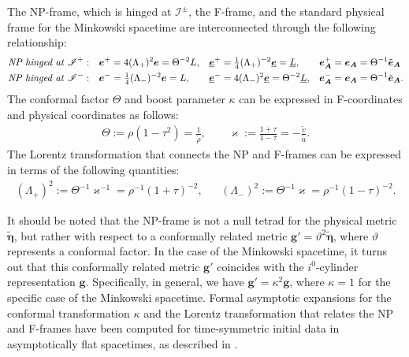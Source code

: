 \begin{proposition}\label{Prop:NPtoFgauge}
  The NP-frame, which is hinged at $\mathscr{I}^{\pm}$, the F-frame, and the standard physical frame for the Minkowski spacetime are interconnected through the following relationship:
\begin{align*}
  \text{\emph{NP hinged at} $\mathscr{I}^{+}$}:& \quad\boldsymbol{e}^{+} = 4(\Lambda_{+})^{2} \boldsymbol{e} = \Theta^{-2} L, && \underline{\boldsymbol{e}}^{+}=
  \tfrac{1}{4}(\Lambda_{+})^{-2}\underline{\boldsymbol{e}} = \underline{L}, && \boldsymbol{e}_{\boldsymbol{A}}^{+}= \boldsymbol{e}_{\boldsymbol{A}}= \Theta^{-1}\tilde{\boldsymbol{e}}_{\boldsymbol{A}}\\ \text{\emph{NP hinged at} $\mathscr{I}^{-}$}:& \quad\boldsymbol{e}^{-} =
  \tfrac{1}{4}(\Lambda_{-})^{-2} \boldsymbol{e} = L, && \underline{\boldsymbol{e}}^{-}= 4(\Lambda_{-})^{2}\underline{\boldsymbol{e}} = \Theta^{-2} \underline{L}, && \boldsymbol{e}_{\boldsymbol{A}}^{-}= \boldsymbol{e}_{\boldsymbol{A}}= \Theta^{-1}\tilde{\boldsymbol{e}}_{\boldsymbol{A}}.
\end{align*}
The conformal factor $\Theta$ and boost parameter $\kappa$ can be expressed in F-coordinates and physical coordinates as follows:
\begin{align}\label{eq:CF-thetaAndBoostParameter}
  \Theta := \rho (1-\tau^2) = \frac{1}{\tilde{\rho}}, \qquad \varkappa := \frac{1+\tau}{1-\tau} = -\frac{\tilde{v}}{\tilde{u}}.
\end{align}
The Lorentz transformation that connects the NP and F-frames can be expressed in terms of the following quantities:
\begin{align}\label{eq:LorentzTransf}
  (\Lambda_{+})^{2}:= \Theta^{-1}\varkappa^{-1}= \rho^{-1}(1+\tau)^{-2}, && (\Lambda_{-})^{2}:= \Theta^{-1}\varkappa= \rho^{-1}(1-\tau)^{-2}.
\end{align}
\end{proposition}
\begin{remark}
  It should be noted that the NP-frame is not a null tetrad for the physical metric $\tilde{\boldsymbol{\eta}}$, but rather with respect to a conformally related metric $\boldsymbol{g'}=\vartheta^2\tilde{\boldsymbol{\eta}}$, where $\vartheta$ represents a conformal factor. In the case of the Minkowski spacetime, it turns out that this conformally related metric $\boldsymbol{g'}$ coincides with the $i^0$-cylinder representation $\boldsymbol{g}$. Specifically, in general, we have $\boldsymbol{g'} = \kappa^2\boldsymbol{g}$, where  $\kappa=1$ for the specific case of the Minkowski spacetime.
  Formal asymptotic expansions for the conformal transformation $\kappa$ and the Lorentz transformation that relates the NP and F-frames have been computed for time-symmetric initial data in asymptotically flat spacetimes, as described in \cite{FriKan00}.
\end{remark}
